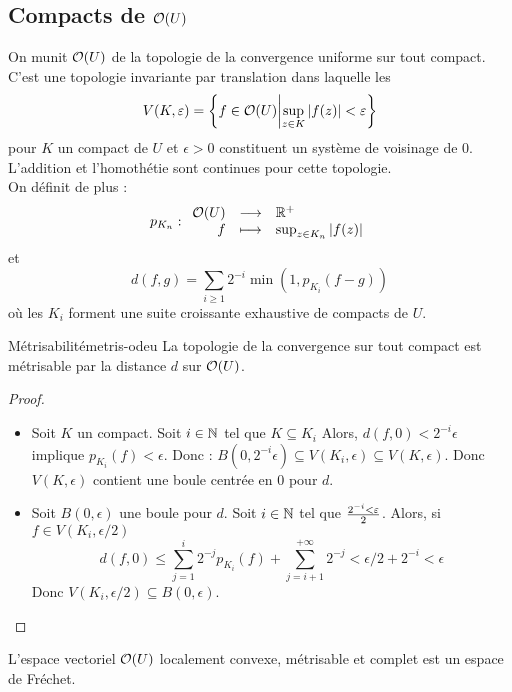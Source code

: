\documentclass{cours}
\begin{document}
\subsection[Compacts de O(U)]{Compacts de $\O(U)$}
On munit $\O(U)$ de la topologie de la convergence uniforme sur tout compact. C'est une topologie invariante par translation dans laquelle les 
\[
    V(K, \epsilon) = \left\{f \in \O(U)\middle| \sup\limits_{z \in K}\abs{f(z)} < \epsilon\right\}
\]
pour $K$ un compact de $U$ et $\epsilon>0$ constituent un système de voisinage de $0$. L'addition et l'homothétie sont continues pour cette topologie. \\
On définit de plus :
\[
    p_{K_{n}} : \begin{array}{rcl}
        \O(U) & \longrightarrow & \R^{+}\\
        f & \longmapsto & \sup_{z \in K_{n}}\abs{f(z)}
    \end{array}
\]
et 
\[
    d(f, g) = \sum_{i \geq 1}2^{-i}\min(1, p_{K_{i}}(f - g))
\]
où les $K_{i}$ forment une suite croissante exhaustive de compacts de $U$. 
\begin{lemme}{Métrisabilité}{metris-odeu}
    La topologie de la convergence sur tout compact est métrisable par la distance $d$ sur $\O(U)$.
\end{lemme}
\begin{proof}
    \begin{itemize}
        \item Soit $K$ un compact. Soit $i \in \N$ tel que $K \subseteq K_{i}$ Alors, $d(f, 0) < 2^{-i} \epsilon$ implique $p_{K_{i}}(f) < \epsilon$. Donc : $B(0, 2^{-i}\epsilon) \subseteq V(K_{i}, \epsilon) \subseteq V(K, \epsilon)$. Donc $V(K, \epsilon)$ contient une boule centrée en $0$ pour $d$. 
        \item Soit $B(0, \epsilon)$ une boule pour $d$. Soit $i \in \N$ tel que $2^{-i} < \epsilon \over 2$. Alors, si $f \in V(K_{i}, \epsilon/2)$
        \[
            d(f, 0) \leq \sum_{j = 1}^{i}2^{-j}p_{K_{i}}(f) + \sum_{j = i + 1}^{+\infty}2^{-j} < \epsilon/2 + 2^{-i} < \epsilon
        \]
        Donc $V(K_{i}, \epsilon/2) \subseteq B(0, \epsilon)$.
    \end{itemize}
\end{proof}
L'espace vectoriel $\O(U)$ localement convexe, métrisable et complet est un espace de Fréchet. 
\end{document}
